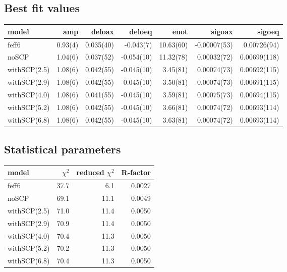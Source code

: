 \documentclass[11pt]{article}
\begin{document}
\subsection{Best fit values}
\label{sec:orgheadline38}

\begin{center}
  \footnotesize
  \begin{tabular}{lrrrrrr}
    model & amp & deloax & deloeq & enot & sigoax & sigoeq\\
    \hline
    feff6        & 0.93(4) & 0.035(40) & -0.043(7)  & 10.63(60) & -0.00007(53) & 0.00726(94)\\
    noSCP        & 1.04(6) & 0.037(52) & -0.054(10) & 11.32(78) &  0.00032(72) & 0.00699(118)\\
    withSCP(2.5) & 1.08(6) & 0.042(55) & -0.045(10) &  3.45(81) &  0.00074(73) & 0.00692(115)\\
    withSCP(2.9) & 1.08(6) & 0.042(55) & -0.045(10) &  3.50(81) &  0.00074(73) & 0.00691(115)\\
    withSCP(4.0) & 1.08(6) & 0.041(55) & -0.045(10) &  3.59(81) &  0.00075(73) & 0.00694(115)\\
    withSCP(5.2) & 1.08(6) & 0.042(55) & -0.045(10) &  3.66(81) &  0.00074(72) & 0.00693(114)\\
    withSCP(6.8) & 1.08(6) & 0.042(55) & -0.045(10) &  3.63(81) &  0.00074(72) & 0.00693(114)\\
  \end{tabular}
\end{center}

\subsection{Statistical parameters}
\label{sec:orgheadline39}

\begin{center}
  \begin{tabular}{lrrr}
    model & $\chi^2$ & reduced $\chi^2$ & R-factor\\
    \hline
    feff6        & 37.7 &  6.1 & 0.0027\\
    noSCP        & 69.1 & 11.1 & 0.0049\\
    withSCP(2.5) & 71.0 & 11.4 & 0.0050\\
    withSCP(2.9) & 70.9 & 11.4 & 0.0050\\
    withSCP(4.0) & 70.4 & 11.3 & 0.0050\\
    withSCP(5.2) & 70.2 & 11.3 & 0.0050\\
    withSCP(6.8) & 70.4 & 11.3 & 0.0050\\
  \end{tabular}
\end{center}
\end{document}

